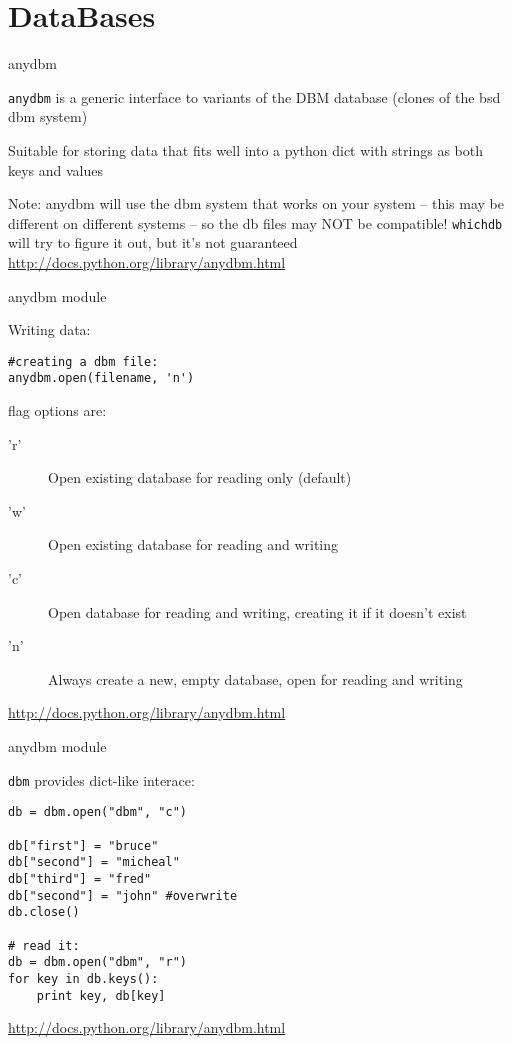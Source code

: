 \documentclass{beamer}
\begin{document}
\section{DataBases} 

\begin{frame}[fragile]{anydbm}

\vfill
{\Large \verb|anydbm| is a generic interface to variants of the DBM database (clones of the bsd dbm system)}

{\Large Suitable for storing data that fits well into a python dict with strings as both keys and values}

{\Large Note: anydbm will use the dbm system that works on your system --
        this may be different on different systems -- so the db files may NOT
        be compatible! \verb|whichdb| will try to figure it out, but it's not
        guaranteed}
\vfill
\url{http://docs.python.org/library/anydbm.html}
\end{frame} 

\begin{frame}[fragile]{anydbm module}

{\Large Writing data:}

\begin{verbatim}
#creating a dbm file:
anydbm.open(filename, 'n') 
\end{verbatim}

{\large flag options are: }
\begin{description}
  \item['r'] 	Open existing database for reading only (default)
  \item['w'] 	Open existing database for reading and writing
  \item['c'] 	Open database for reading and writing, creating it if it doesn’t exist
  \item['n'] 	Always create a new, empty database, open for reading and writing
\end{description}
\vfill
\url{http://docs.python.org/library/anydbm.html}
\end{frame}

\begin{frame}[fragile]{anydbm module}

{\Large \verb|dbm| provides dict-like interace:}

\begin{verbatim}
db = dbm.open("dbm", "c")

db["first"] = "bruce"
db["second"] = "micheal"
db["third"] = "fred"
db["second"] = "john" #overwrite
db.close()

# read it:
db = dbm.open("dbm", "r")
for key in db.keys():
    print key, db[key]
\end{verbatim}

\vfill
\url{http://docs.python.org/library/anydbm.html}
\end{frame}
\end{document}
